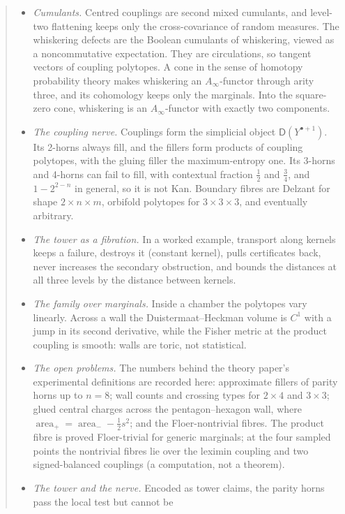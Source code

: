 \documentclass[11pt]{article}
\theoremstyle{definition}
\theoremstyle{remark}
\newcommand{\D}{\mathsf{D}}
\begin{document}
\begin{abstract}
\begin{itemize}[leftmargin=*]
  of the corresponding surface, with explicit central charges. We state what this does and does not
  connect.
\item \emph{Cumulants.} Centred couplings are second mixed cumulants, and level-two flattening keeps only
  the cross-covariance of random measures. The whiskering defects are the Boolean cumulants of
  whiskering, viewed as a noncommutative expectation. They are circulations, so tangent vectors of coupling
  polytopes. A cone in the sense of homotopy probability theory makes whiskering an $A_\infty$-functor through
  arity three, and its cohomology keeps only the marginals. Into the square-zero cone, whiskering is an
  $A_\infty$-functor with exactly two components.
\item \emph{The coupling nerve.} Couplings form the simplicial object $\D(Y^{\bullet+1})$. Its 2-horns always fill, and the
  fillers form products of coupling polytopes, with the gluing filler the maximum-entropy one. Its 3-horns and
  4-horns can fail to fill, with contextual fraction $\tfrac12$ and $\tfrac34$, and $1-2^{2-n}$ in general, so it is not Kan. Boundary fibres are
  Delzant for shape $2\times n\times m$, orbifold polytopes for $3\times3\times3$, and eventually arbitrary.
\item \emph{The tower as a fibration.} In a worked example, transport along kernels keeps a failure, destroys it
  (constant kernel), pulls certificates back, never increases the secondary obstruction, and bounds the
  distances at all three levels by the distance between kernels.
\item \emph{The family over marginals.} Inside a chamber the polytopes vary linearly. Across a wall the
  Duistermaat--Heckman volume is $C^1$ with a jump in its second derivative, while the Fisher metric at the
  product coupling is smooth: walls are toric, not statistical.
\item \emph{The open problems.} The numbers behind the theory paper's experimental definitions are recorded here:
  approximate fillers of parity horns up to $n=8$; wall counts and crossing types for $2\times4$ and $3\times3$; glued
  central charges across the pentagon--hexagon wall, where $\operatorname{area}_+=\operatorname{area}_--\frac12s^2$; and the
  Floer-nontrivial fibres. The product fibre is proved Floer-trivial for generic marginals; at the four sampled points
  the nontrivial fibres lie over the leximin coupling and two signed-balanced couplings (a computation, not a theorem).
\item \emph{The tower and the nerve.} Encoded as tower claims, the parity horns pass the local test but cannot be

\end{itemize}
\end{abstract}
\end{document}
